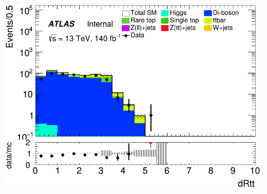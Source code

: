 \documentclass[usenames,dvipsnames]{beamer}
\begin{document}
\begin{frame}
\begin{minipage}{0.32\textwidth}
        \includegraphics[width=\textwidth]{graphics/LLL_met/LLL_met_dRtt.png}
    \end{minipage}
\end{frame}
\end{document}
